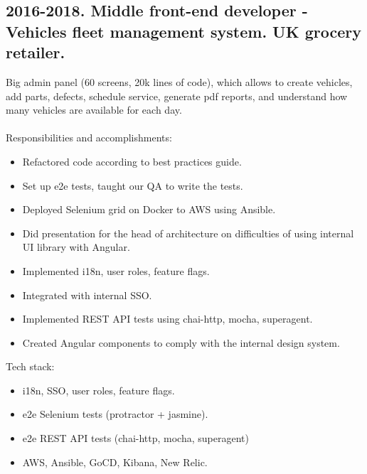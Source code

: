 \documentclass[a4paper, 14pt]{article}
\begin{document}
  \subsection{2016-2018. Middle front-end developer - Vehicles fleet management system. UK grocery retailer.
}
  Big admin panel (60 screens, 20k lines of code), which allows to create vehicles, add parts, defects, schedule service, generate pdf reports, and understand how many vehicles are available for each day. \\
  \\
  Responsibilities and accomplishments:
    \begin{itemize}
      \item Refactored code according to best practices guide. \\
      \item Set up e2e tests, taught our QA to write the tests. \\
      \item Deployed Selenium grid on Docker to AWS using Ansible. \\
      \item Did presentation for the head of architecture on difficulties of using internal UI library with Angular. \\
      \item Implemented i18n, user roles, feature flags. \\
      \item Integrated with internal SSO. \\
      \item Implemented REST API tests using chai-http, mocha, superagent. \\
      \item Created Angular components to comply with the internal design system.
    \end{itemize}
    \bigskip
    Tech stack:
    \begin{itemize}
      \item i18n, SSO, user roles, feature flags. \\
      \item e2e Selenium tests (protractor + jasmine). \\
      \item e2e REST API tests (chai-http, mocha, superagent) \\
      \item AWS, Ansible, GoCD, Kibana, New Relic.
    \end{itemize}
\end{document}
